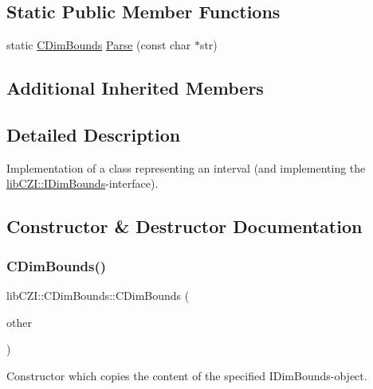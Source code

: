 \subsection*{Static Public Member Functions}
\begin{DoxyCompactItemize}
\item 
static \hyperlink{classlib_c_z_i_1_1_c_dim_bounds}{C\+Dim\+Bounds} \hyperlink{classlib_c_z_i_1_1_c_dim_bounds_a10a59c07b8f3cb2ec8d8a082e9167bfb}{Parse} (const char $\ast$str)
\end{DoxyCompactItemize}
\subsection*{Additional Inherited Members}


\subsection{Detailed Description}
Implementation of a class representing an interval (and implementing the {\ttfamily \hyperlink{classlib_c_z_i_1_1_i_dim_bounds}{lib\+C\+Z\+I\+::\+I\+Dim\+Bounds}}-\/interface). 

\subsection{Constructor \& Destructor Documentation}
\mbox{\label{classlib_c_z_i_1_1_c_dim_bounds_a176e01bb95a50cecf18f0e172937151e}} 
\subsubsection{\texorpdfstring{C\+Dim\+Bounds()}{CDimBounds()}\hspace{0.1cm}{\footnotesize\ttfamily [1/2]}}
{\footnotesize\ttfamily lib\+C\+Z\+I\+::\+C\+Dim\+Bounds\+::\+C\+Dim\+Bounds (\begin{DoxyParamCaption}\item[{const \hyperlink{classlib_c_z_i_1_1_i_dim_bounds}{I\+Dim\+Bounds} $\ast$}]{other }\end{DoxyParamCaption})\hspace{0.3cm}{\ttfamily [inline]}}

Constructor which copies the content of the specified I\+Dim\+Bounds-\/object.


